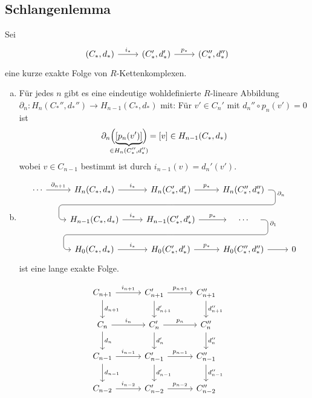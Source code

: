 \subsection{Schlangenlemma} %
\label{sub:812}
Sei 
\[
	\begin{tikzcd}
		(C_*,d_*) \rar["i_*"] & (C_*',d_*') \rar["p_*"] & (C_*'',d_*'')
	\end{tikzcd}
\]
eine kurze exakte Folge von $R$-Kettenkomplexen.
\begin{enumerate}[a)]
	\item Für jedes $n$ gibt es eine eindeutige wohldefinierte $R$-lineare Abbildung $\partial_n \colon H_n(C_*'',d_*'') \to H_{n-1}(C_*,d_*)$ mit:
	Für $v' \in C_n'$ mit $d_n'' \circ p_n(v')=0$ ist 
	\[
		\partial_n \enbrace[\Big]{\underbrace{\benbrace*{p_n(v')}}_{\mathclap{\in H_n(C_*'',d_*'')}} } = [v] \in H_{n-1}(C_*,d_*)
	\]
	wobei $v \in C_{n-1}$ bestimmt ist durch $i_{n-1}(v)= d_n'(v')$.
	\item 
	\[
		\begin{tikzcd}
			\cdots \rar["\partial_{n+1}"] & H_n(C_*,d_*) \rar["i_*"] & 
				H_n(C_*',d_*') \arrow[d, phantom, ""{coordinate, name=Z}] \rar["p_*"] 
					& H_n(C_*'',d_*'') \arrow[dll, "\partial_n" very near start, rounded corners, to path={
																	-- ([xshift=2ex]\tikztostart.east)
																	|- (Z) [near end]\tikztonodes
																	-| ([xshift=-2ex]\tikztotarget.west)
																	-- (\tikztotarget)
																	}] & \\
			& H_{n-1}(C_*,d_*) \rar["i_*"] 
				& H_{n-1}(C_*',d_*') \rar["p_*"] \arrow[d, phantom, ""{coordinate, name=R}]
					& \quad \cdots  \quad \arrow[dll, "\partial_1" very near start, rounded corners, to path={
																	-- ([xshift=2ex]\tikztostart.east)
																	|- (R) [near end]\tikztonodes
																	-| ([xshift=-2ex]\tikztotarget.west)
																	-- (\tikztotarget)
																	}]& \\
			& H_0(C_*,d_*) \rar["i_*"] & H_0(C_*',d_*') \rar["p_*"] & H_0(C_*'',d_*'') \rar & 0
		\end{tikzcd}
	\]
	ist eine lange exakte Folge. 
\end{enumerate}
\[
	\begin{tikzcd}[row sep=2em, column sep=3em]
		C_{n+1} \rar["i_{n+1}"] \dar["d_{n+1}"] & C_{n+1}' \rar["p_{n+1}"] \dar["d_{n+1}'"] & C_{n+1}'' \dar["d_{n+1}''"] \\
		C_n \rar["i_n"] \dar["d_{n}"]& C_n' \rar["p_n"] \dar["d_{n}'"]& C_n'' \dar["d_{n}''"]\\
		C_{n-1} \rar["i_{n-1}"] \dar["d_{n-1}"]& C_{n-1}'  \rar["p_{n-1}"] \dar["d_{n-1}'"]& C_{n-1}'' \dar["d_{n-1}''"]\\
		C_{n-2} \rar["i_{n-2}"]& C_{n-2}' \rar["p_{n-2}"] & C_{n-2}''
	\end{tikzcd}
\]
